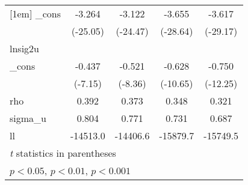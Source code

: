 {\begin{tabular}{l*{4}{c}}
[1em]
\_cons      &      -3.264\sym{***}&      -3.122\sym{***}&      -3.655\sym{***}&      -3.617\sym{***}\\
            &    (-25.05)         &    (-24.47)         &    (-28.64)         &    (-29.17)         \\
\hline
lnsig2u     &                     &                     &                     &                     \\
\_cons      &      -0.437\sym{***}&      -0.521\sym{***}&      -0.628\sym{***}&      -0.750\sym{***}\\
            &     (-7.15)         &     (-8.36)         &    (-10.65)         &    (-12.25)         \\
\hline
rho         &       0.392         &       0.373         &       0.348         &       0.321         \\
sigma\_u     &       0.804         &       0.771         &       0.731         &       0.687         \\
ll          &    -14513.0         &    -14406.6         &    -15879.7         &    -15749.5         \\
\hline\hline
\multicolumn{5}{l}{\footnotesize \textit{t} statistics in parentheses}\\
\multicolumn{5}{l}{\footnotesize \sym{*} \(p<0.05\), \sym{**} \(p<0.01\), \sym{***} \(p<0.001\)}\\
\end{tabular}
}
